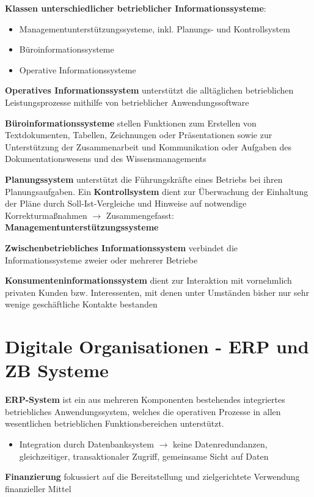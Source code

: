 \textbf{Klassen unterschiedlicher betrieblicher Informationssysteme}:
\begin{itemize}
	\item Managementunterstützungssysteme, inkl. Planungs- und Kontrollsystem
	\item Büroinformationssysteme
	\item Operative Informationssysteme 
\end{itemize}

\textbf{Operatives Informationssystem} unterstützt die alltäglichen betrieblichen Leistungsprozesse mithilfe von
betrieblicher Anwendungssoftware

\textbf{Büroinformationssysteme} stellen Funktionen zum Erstellen von Textdokumenten, Tabellen, Zeichnungen oder Präsentationen sowie zur Unterstützung der Zusammenarbeit und Kommunikation oder Aufgaben des Dokumentationswesens und des Wissensmanagements

\textbf{Planungssystem} unterstützt die Führungskräfte eines Betriebs bei ihren Planungsaufgaben. Ein \textbf{Kontrollsystem} dient zur Überwachung der Einhaltung der Pläne durch Soll-Ist-Vergleiche und Hinweise auf notwendige Korrekturmaßnahmen $\rightarrow$ Zusammengefasst: \textbf{Managementunterstützungssysteme}

\textbf{Zwischenbetriebliches Informationssystem} verbindet die Informationssysteme zweier oder mehrerer Betriebe

\textbf{Konsumenteninformationssystem} dient zur Interaktion mit vornehmlich privaten Kunden bzw.
Interessenten, mit denen unter Umständen bisher nur sehr wenige geschäftliche Kontakte bestanden

\section{Digitale Organisationen - ERP und ZB Systeme}
\textbf{ERP-System} ist ein aus mehreren Komponenten bestehendes integriertes betriebliches Anwendungssystem, welches die operativen Prozesse in allen wesentlichen betrieblichen Funktionsbereichen unterstützt.
\begin{itemize}
	\item Integration durch Datenbanksystem $\rightarrow$ keine Datenredundanzen, gleichzeitiger, transaktionaler Zugriff, gemeinsame Sicht auf Daten
\end{itemize}

\textbf{Finanzierung} fokussiert auf die Bereitstellung und zielgerichtete Verwendung finanzieller Mittel

